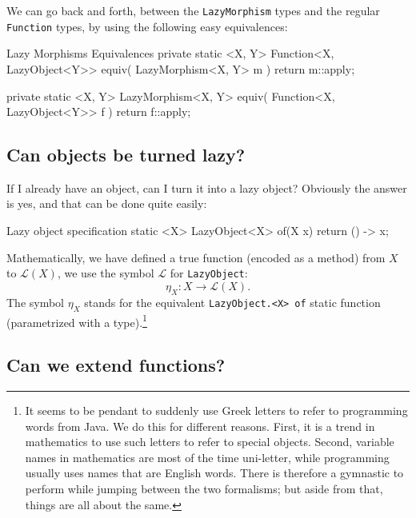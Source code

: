 \documentclass[12pt,a4paper]{report}
\renewcommand{\baselinestretch}{1.5}
\theoremstyle{theorem}
\theoremstyle{definition}
\begin{document}
We can go back and forth, between the \lstinline{LazyMorphism}{}
types and the regular \lstinline{Function}{} types, by using the
following easy equivalences:

\begin{javacode}{Lazy Morphisms Equivalences}
private static <X, Y> Function<X, LazyObject<Y>> equiv(
  LazyMorphism<X, Y> m
) { return m::apply; }
  
private static <X, Y> LazyMorphism<X, Y> equiv(
  Function<X, LazyObject<Y>> f
) { return f::apply; }
\end{javacode}

\renewcommand{\baselinestretch}{1.5} 
\selectfont


\subsection{Can objects be turned lazy?}

If I already have an object,
can I turn it into a lazy object? Obviously the answer is yes,
and that can be done quite easily:

\renewcommand{\baselinestretch}{1} 
\selectfont

\begin{javacode}{Lazy object specification}
static <X> LazyObject<X> of(X x)
  { return () -> x; }
\end{javacode}

\renewcommand{\baselinestretch}{1.5} 
\selectfont

Mathematically, we have defined a
true function (encoded as a method) from $X$ to $\mathcal{L}(X)$,
we use the symbol $\mathcal{L}$ for \lstinline{LazyObject}{}:
	\[ \eta_X : X\to \mathcal{L}(X) .\]
The symbol $\eta_X$ stands for the equivalent \lstinline{LazyObject.<X> of}{}
static function (parametrized with a type).\footnote{It seems to be pendant
to suddenly use Greek letters to refer to programming words from Java.
We do this for different reasons. First, it is a trend in mathematics to use
such letters to refer to special objects. Second, variable names in mathematics
are most of the time uni-letter, while programming usually uses
names that are English words. There is therefore a gymnastic to perform
while jumping between the two formalisms; but aside from that, things are
all about the same.}

\subsection{Can we extend functions?}
\end{document}
